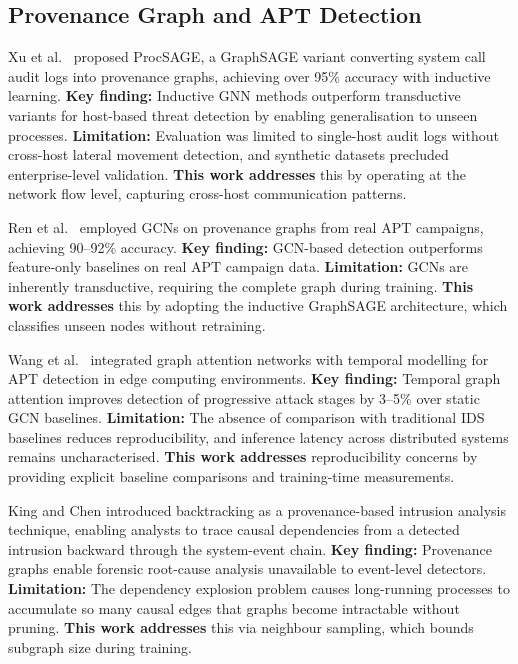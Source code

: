 \documentclass[conference]{IEEEtran}
\begin{document}
\subsection{Provenance Graph and APT Detection}

Xu et al.~\cite{xu2024} proposed ProcSAGE, a GraphSAGE variant converting
system call audit logs into provenance graphs, achieving over 95\% accuracy with
inductive learning. \textbf{Key finding:} Inductive GNN methods outperform
transductive variants for host-based threat detection by enabling
generalisation to unseen processes. \textbf{Limitation:} Evaluation was limited
to single-host audit logs without cross-host lateral movement detection, and
synthetic datasets precluded enterprise-level validation. \textbf{This work
addresses} this by operating at the network flow level, capturing cross-host
communication patterns.

Ren et al.~\cite{ren2023} employed GCNs on provenance graphs from real APT
campaigns, achieving 90--92\% accuracy. \textbf{Key finding:} GCN-based
detection outperforms feature-only baselines on real APT campaign data.
\textbf{Limitation:} GCNs are inherently transductive, requiring the complete
graph during training. \textbf{This work addresses} this by adopting the
inductive GraphSAGE architecture, which classifies unseen nodes without
retraining.

Wang et al.~\cite{wang2025} integrated graph attention networks with temporal
modelling for APT detection in edge computing environments. \textbf{Key
finding:} Temporal graph attention improves detection of progressive attack
stages by 3--5\% over static GCN baselines. \textbf{Limitation:} The absence
of comparison with traditional IDS baselines reduces reproducibility, and
inference latency across distributed systems remains uncharacterised.
\textbf{This work addresses} reproducibility concerns by providing explicit
baseline comparisons and training-time measurements.

King and Chen \cite{king2003} introduced backtracking as a provenance-based
intrusion analysis technique, enabling analysts to trace causal dependencies
from a detected intrusion backward through the system-event chain.
\textbf{Key finding:} Provenance graphs enable forensic root-cause analysis
unavailable to event-level detectors. \textbf{Limitation:} The dependency
explosion problem causes long-running processes to accumulate so many causal
edges that graphs become intractable without pruning. \textbf{This work
addresses} this via neighbour sampling, which bounds subgraph size during
training.
\end{document}
